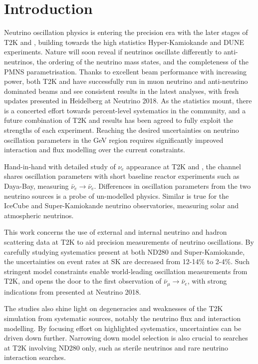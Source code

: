 \chapter{Introduction}
\label{chap:intro}
Neutrino oscillation physics is entering the precision era with the later stages of T2K\cite{t2k_2017} and \nova\cite{nova_2018}, building towards the high statistics Hyper-Kamiokande\cite{hyperk} and DUNE\cite{dune} experiments. Nature will soon reveal if neutrinos oscillate differently to anti-neutrinos, the ordering of the neutrino mass states, and the completeness of the PMNS parametrisation\cite{p1,p2,mns}. Thanks to excellent beam performance with increasing power, both T2K and \nova have successfully run in muon neutrino and anti-neutrino dominated beams and see consistent results in the latest analyses, with fresh updates presented in Heidelberg at Neutrino 2018\cite{t2k_neutrino2018, nova_neutrino2018}. As the statistics mount, there is a concerted effort towards percent-level systematics in the community, and a future combination of T2K and \nova results has been agreed to fully exploit the strengths of each experiment\cite{t2k_nova, t2k_nova_meet}. Reaching the desired uncertainties on neutrino oscillation parameters in the GeV region requires significantly improved interaction and flux modelling over the current constraints\cite{t2k_ii, dune_exp}.

Hand-in-hand with detailed study of $\nu_e$ appearance at T2K and \nova, the channel shares oscillation parameters with short baseline reactor experiments such as Daya-Bay\cite{daya_bay}, measuring $\bar{\nu}_e\rightarrow \bar{\nu}_e$. Differences in oscillation parameters from the two neutrino sources is a probe of un-modelled physics. Similar is true for the IceCube\cite{icecube} and Super-Kamiokande\cite{superk} neutrino observatories, measuring solar and atmospheric neutrinos.

This work concerns the use of external and internal neutrino and hadron scattering data at T2K to aid precision measurements of neutrino oscillations. By carefully studying systematics present at both ND280 and Super-Kamiokande, the uncertainties on event rates at SK are decreased from 12-14\% to 2-4\%. Such stringent model constraints enable world-leading oscillation measurements from T2K\cite{pdg_2017}, and opens the door to the first observation of $\bar{\nu}_\mu \rightarrow \bar{\nu}_e$, with strong indications from \nova presented at Neutrino 2018\cite{nova_neutrino2018}.

The studies also shine light on degeneracies and weaknesses of the T2K simulation from systematic sources, notably the neutrino flux and interaction modelling. By focusing effort on highlighted systematics, uncertainties can be driven down further. Narrowing down model selection is also crucial to searches at T2K involving ND280 only, such as sterile neutrinos and rare neutrino interaction searches.

